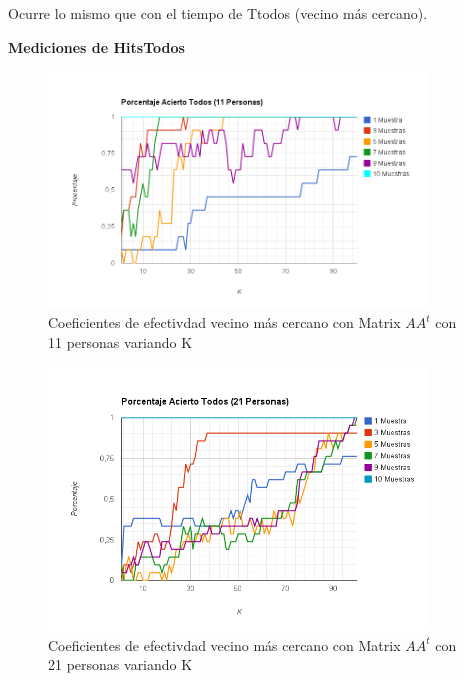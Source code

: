 Ocurre lo mismo que con el tiempo de Ttodos (vecino más cercano).

\textbf{Mediciones de HitsTodos}

\begin{figure}[H] \includegraphics[width=0.9\textwidth]{img/imagej.png} \caption{Coeficientes de
    efectivdad vecino más cercano con Matrix $AA^t$ con 11 personas variando K} \end{figure}

\begin{figure}[H] \includegraphics[width=0.9\textwidth]{img/imagek.png} \caption{Coeficientes de
    efectivdad vecino más cercano con Matrix $AA^t$ con 21 personas variando K} \end{figure}

